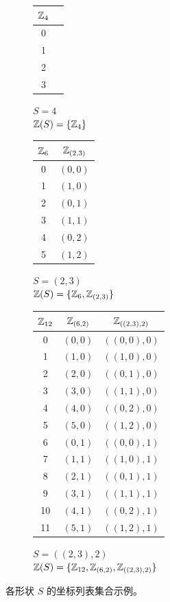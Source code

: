 \begin{figure}[ht]
\centering
\begin{subfigure}[t]{0.2\textwidth}
    \centering
    \begin{tabular}{|c|c|}
    $\mathbb{Z}_4$ \\
    \hline
    0 \\
    1 \\
    2 \\
    3 \\
    \hline
    \end{tabular}
    \caption*{$S = 4$ \\ $\mathbb{Z}(S) = \{\mathbb{Z}_4\}$}
\end{subfigure}
\begin{subfigure}[t]{0.3\textwidth}
    \centering
    \begin{tabular}{|c|c|}
    $\mathbb{Z}_6$   & $\mathbb{Z}_{(2,3)}$ \\
    \hline
    0        & $(0,0)$ \\
    1        & $(1,0)$ \\
    2        & $(0,1)$ \\
    3        & $(1,1)$ \\
    4        & $(0,2)$ \\
    5        & $(1,2)$ \\
    \hline
    \end{tabular}
    \caption*{$S = (2,3)$ \\ $\mathbb{Z}(S) = \{\mathbb{Z}_6, \mathbb{Z}_{(2,3)}\}$}
\end{subfigure}
\begin{subfigure}[t]{0.4\textwidth}
    \centering
    \begin{tabular}{|c|c|c|}
    $\mathbb{Z}_{12}$ & $\mathbb{Z}_{(6,2)}$ & $\mathbb{Z}_{((2,3),2)}$ \\
    \hline
    0         & $(0,0)$         & $((0,0),0)$ \\
    1         & $(1,0)$         & $((1,0),0)$ \\
    2         & $(2,0)$         & $((0,1),0)$ \\
    3         & $(3,0)$         & $((1,1),0)$ \\
    4         & $(4,0)$         & $((0,2),0)$ \\
    5         & $(5,0)$         & $((1,2),0)$ \\
    6         & $(0,1)$         & $((0,0),1)$ \\
    7         & $(1,1)$         & $((1,0),1)$ \\
    8         & $(2,1)$         & $((0,1),1)$ \\
    9         & $(3,1)$         & $((1,1),1)$ \\
    10        & $(4,1)$         & $((0,2),1)$ \\
    11        & $(5,1)$         & $((1,2),1)$ \\
    \hline
    \end{tabular}
    \caption*{$S = ((2,3),2)$ \\ $\mathbb{Z}(S) = \{\mathbb{Z}_{12}, \mathbb{Z}_{(6,2)}, \mathbb{Z}_{((2,3),2)}\}$}
\end{subfigure}
\caption{各形状 $S$ 的坐标列表集合示例。}
\label{fig:coordlists}
\end{figure}


